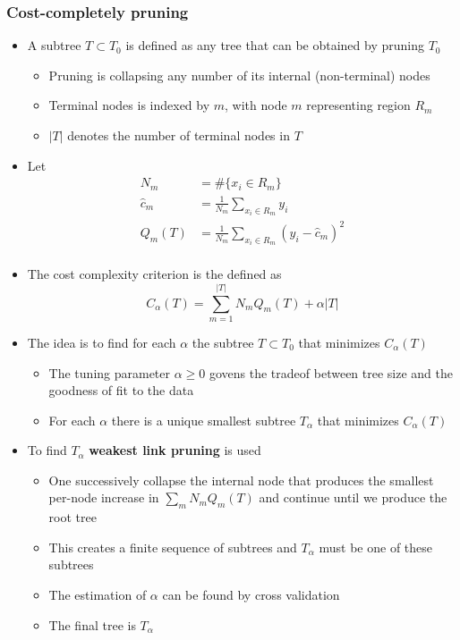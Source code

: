 \documentclass[a4, english]{article}
\begin{document}
\subsubsection{Cost-completely pruning}
\begin{itemize}
	\item A subtree $T \subset T_0$ is defined as any tree that can be obtained by pruning $T_0$ 
  \begin{itemize}
    \item Pruning is collapsing any number of its internal (non-terminal) nodes
	  \item Terminal nodes is indexed by $m$, with node $m$ representing region $R_m$ 
	  \item $|T|$ denotes the number of terminal nodes in $T$ 
  \end{itemize}
  \item Let
  \begin{align*}
    N_m &= \# \{x_i \in R_m\} \\
    \hat c_m &= \frac1{N_m} \sum_{x_i \in R_m} y_i \\
    Q_m(T) &=  \frac1{N_m} \sum_{x_i \in R_m} (y_i-\hat c_m)^2 \\
  \end{align*}
  \item The cost complexity criterion is the defined as  
  \begin{equation*}
    C_\alpha(T) = \sum_{m=1}^{|T|} N_m Q_m(T) + \alpha |T| 
  \end{equation*}
  \item The idea is to find for each $\alpha$ the subtree $T \subset T_0$ that minimizes $C_\alpha(T)$ 
  \begin{itemize}
  	\item The tuning parameter $\alpha \geq 0$ govens the tradeof between tree size and the goodness of fit to the data    
  	\item For each $\alpha$ there is a unique smallest subtree $T_\alpha$ that minimizes $C_\alpha(T)$ 
  \end{itemize}
  \item To find $T_\alpha$ \textbf{weakest link pruning} is used  
  \begin{itemize}
  	\item One successively collapse the internal node that produces the smallest per-node increase in $\sum_m N_mQ_m(T)$ and continue until we produce the root tree   
    \item This creates a finite sequence of subtrees and $T_\alpha$ must be one of these subtrees 
    \item The estimation of $\alpha$ can be found by cross validation  
    \item The final tree is $T_\alpha$ 
  \end{itemize}
\end{itemize}
\end{document}
